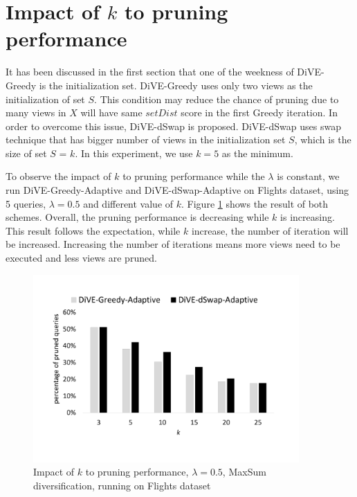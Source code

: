 \documentclass{article}
\begin{document}
\section{Impact of $ k $ to pruning performance}

It has been discussed in the first section that one of the weekness of DiVE-Greedy is the initialization set. DiVE-Greedy uses only two views as the initialization of set $S$. This condition may reduce the chance of pruning due to many views in $X$ will have same $setDist$ score in the first Greedy iteration. In order to overcome this issue, DiVE-dSwap is proposed. DiVE-dSwap uses swap technique that has bigger number of views in the initialization set $S$, which is the size of set $S$ = $k$. In this experiment, we use $k = 5$ as the minimum.  

To observe the impact of $k$ to pruning performance while the $\lambda$ is constant, we run DiVE-Greedy-Adaptive and DiVE-dSwap-Adaptive on Flights dataset, using 5 queries, $\lambda = 0.5$ and different value of $k$. Figure \ref{fig:impact-of-k-pruning-performance} shows the result of both schemes. Overall, the pruning performance is decreasing while $k$ is increasing. This result follows the expectation, while $k$ increase, the number of iteration will be increased. Increasing the number of iterations means more views need to be executed and less views are pruned. 
\begin{figure}
	\begin{center}
		\includegraphics[width=4.0in]{figures/Impact_k_performance}
		\vspace{-30pt}
		\caption{Impact of $k$ to pruning performance, $\lambda = 0.5$, MaxSum diversification, running on Flights dataset}
		\label{fig:impact-of-k-pruning-performance}
		
	\end{center}
\end{figure}
\end{document}
